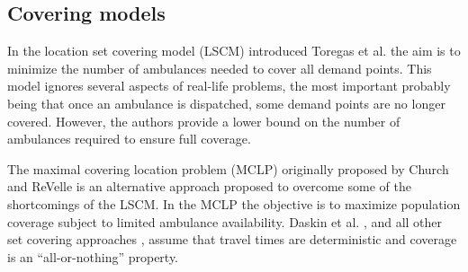 \subsection{Covering models}
In the location set covering model (LSCM)
introduced Toregas et al. \cite{toregas1971location}
the aim
is to minimize
the number of ambulances needed
to cover all demand points.
This model
ignores several aspects of real-life problems,
the most important
probably being that
once an ambulance is dispatched,
some demand points
are no longer covered.
However,
the authors provide
a lower bound
on the number of ambulances
required to ensure full coverage.

The maximal covering location problem (MCLP)
originally proposed by Church and ReVelle \cite{church1974maximal}
is an alternative approach
proposed to overcome some of the shortcomings of the LSCM.
In the MCLP the objective is to maximize population coverage
subject to limited ambulance availability.
Daskin et al. \cite{daskin1981hierarchical},
and all other set covering approaches
\cite{revelle1989maximum,gendreau1997solving,saydam2003accurate},
assume that
travel times are deterministic
and coverage is an ``all-or-nothing'' property.
